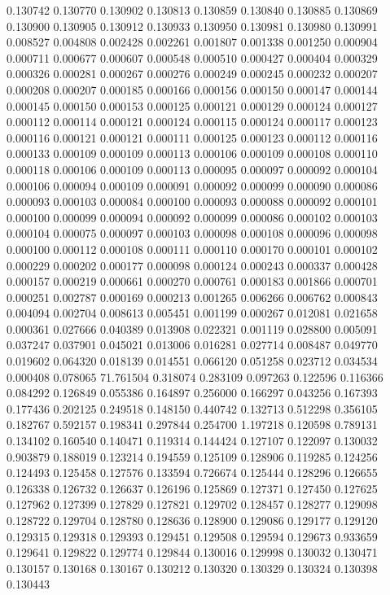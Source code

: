 0.130742
0.130770
0.130902
0.130813
0.130859
0.130840
0.130885
0.130869
0.130900
0.130905
0.130912
0.130933
0.130950
0.130981
0.130980
0.130991
0.008527
0.004808
0.002428
0.002261
0.001807
0.001338
0.001250
0.000904
0.000711
0.000677
0.000607
0.000548
0.000510
0.000427
0.000404
0.000329
0.000326
0.000281
0.000267
0.000276
0.000249
0.000245
0.000232
0.000207
0.000208
0.000207
0.000185
0.000166
0.000156
0.000150
0.000147
0.000144
0.000145
0.000150
0.000153
0.000125
0.000121
0.000129
0.000124
0.000127
0.000112
0.000114
0.000121
0.000124
0.000115
0.000124
0.000117
0.000123
0.000116
0.000121
0.000121
0.000111
0.000125
0.000123
0.000112
0.000116
0.000133
0.000109
0.000109
0.000113
0.000106
0.000109
0.000108
0.000110
0.000118
0.000106
0.000109
0.000113
0.000095
0.000097
0.000092
0.000104
0.000106
0.000094
0.000109
0.000091
0.000092
0.000099
0.000090
0.000086
0.000093
0.000103
0.000084
0.000100
0.000093
0.000088
0.000092
0.000101
0.000100
0.000099
0.000094
0.000092
0.000099
0.000086
0.000102
0.000103
0.000104
0.000075
0.000097
0.000103
0.000098
0.000108
0.000096
0.000098
0.000100
0.000112
0.000108
0.000111
0.000110
0.000170
0.000101
0.000102
0.000229
0.000202
0.000177
0.000098
0.000124
0.000243
0.000337
0.000428
0.000157
0.000219
0.000661
0.000270
0.000761
0.000183
0.001866
0.000701
0.000251
0.002787
0.000169
0.000213
0.001265
0.006266
0.006762
0.000843
0.004094
0.002704
0.008613
0.005451
0.001199
0.000267
0.012081
0.021658
0.000361
0.027666
0.040389
0.013908
0.022321
0.001119
0.028800
0.005091
0.037247
0.037901
0.045021
0.013006
0.016281
0.027714
0.008487
0.049770
0.019602
0.064320
0.018139
0.014551
0.066120
0.051258
0.023712
0.034534
0.000408
0.078065
71.761504
0.318074
0.283109
0.097263
0.122596
0.116366
0.084292
0.126849
0.055386
0.164897
0.256000
0.166297
0.043256
0.167393
0.177436
0.202125
0.249518
0.148150
0.440742
0.132713
0.512298
0.356105
0.182767
0.592157
0.198341
0.297844
0.254700
1.197218
0.120598
0.789131
0.134102
0.160540
0.140471
0.119314
0.144424
0.127107
0.122097
0.130032
0.903879
0.188019
0.123214
0.194559
0.125109
0.128906
0.119285
0.124256
0.124493
0.125458
0.127576
0.133594
0.726674
0.125444
0.128296
0.126655
0.126338
0.126732
0.126637
0.126196
0.125869
0.127371
0.127450
0.127625
0.127962
0.127399
0.127829
0.127821
0.129702
0.128457
0.128277
0.129098
0.128722
0.129704
0.128780
0.128636
0.128900
0.129086
0.129177
0.129120
0.129315
0.129318
0.129393
0.129451
0.129508
0.129594
0.129673
0.933659
0.129641
0.129822
0.129774
0.129844
0.130016
0.129998
0.130032
0.130471
0.130157
0.130168
0.130167
0.130212
0.130320
0.130329
0.130324
0.130398
0.130443
